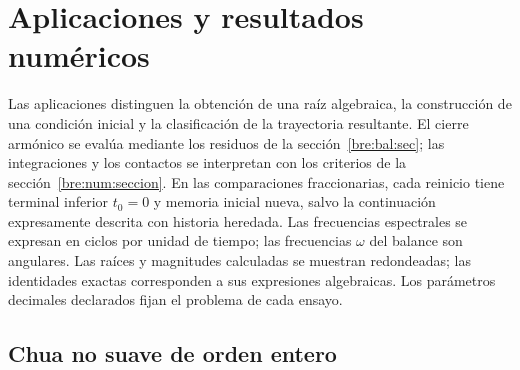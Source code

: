 \section{Aplicaciones y resultados numéricos}
\label{bre:res:section}

Las aplicaciones distinguen la obtención de una raíz algebraica, la
construcción de una condición inicial y la clasificación de la trayectoria
resultante. El cierre armónico se evalúa mediante los residuos de la
sección~\ref{bre:bal:sec}; las integraciones y los contactos se interpretan
con los criterios de la sección~\ref{bre:num:seccion}. En las comparaciones
fraccionarias, cada reinicio tiene terminal inferior \(t_0=0\) y memoria
inicial nueva, salvo la continuación expresamente descrita con historia
heredada. Las frecuencias espectrales se expresan en ciclos por unidad de
tiempo; las frecuencias \(\omega\) del balance son angulares.
Las raíces y magnitudes calculadas se muestran redondeadas; las identidades
exactas corresponden a sus expresiones algebraicas. Los parámetros
decimales declarados fijan el problema de cada ensayo.

\subsection{Chua no suave de orden entero}
\label{bre:res:chua-integer}

